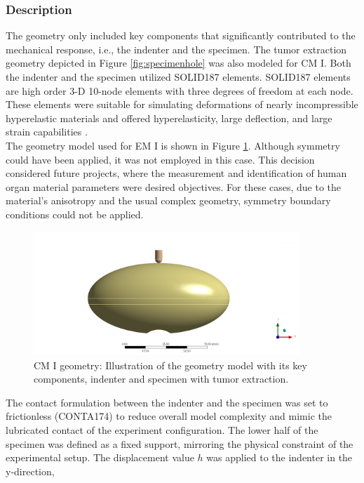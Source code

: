 \subsubsection*{Description}
The geometry only included key components that significantly contributed to the mechanical response,
i.e., the indenter and the specimen. The tumor extraction geometry depicted in Figure \ref{fig:specimenhole}
was also modeled for CM I. Both the indenter and the specimen utilized SOLID187 elements.
SOLID187 elements are high order 3-D \SI{10}{}-node elements with three degrees of freedom at each node.
These elements were suitable for simulating deformations of nearly incompressible hyperelastic materials 
and offered hyperelasticity, large deflection, and large strain capabilities \cite{Ansys2010}.\\
The geometry model used for EM I is shown in Figure \ref{fig:geometrycpI}. %
Although symmetry could have been applied, it was not employed in this case. This decision considered 
future projects, where the measurement and identification of human organ material parameters were desired 
objectives. For these cases, due to the material's anisotropy and the usual complex geometry,
symmetry boundary conditions could not be applied. 
\begin{figure}%
    \centering
   \quad
   \includegraphics[width=10cm]{Images/computational/Assemblynoplatform2.png}%
   \caption[Computational model I geometry]{CM I geometry: Illustration of the geometry model with its key components, indenter and specimen with tumor extraction.}%
   \label{fig:geometrycpI}%
\end{figure}
The contact formulation between the indenter and the specimen was set to frictionless (CONTA174) to reduce
overall model complexity and mimic the lubricated contact of the experiment configuration.
The lower half of the specimen was defined as a fixed support, mirroring the physical constraint of the 
experimental setup. The displacement value $h$ was applied to the indenter in the y-direction,
